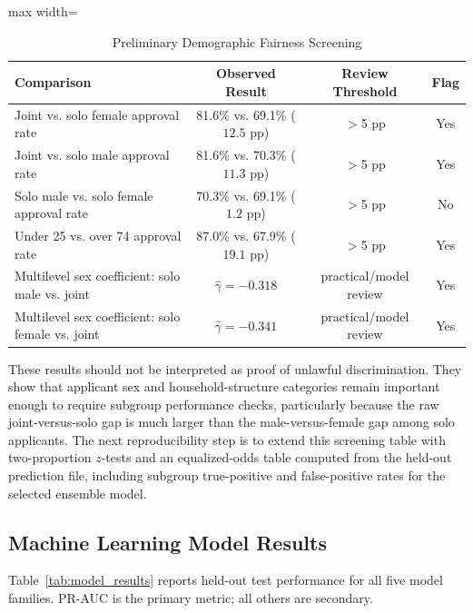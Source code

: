 \documentclass[12pt,letterpaper]{article}
\begin{document}
\begin{table}[H]
\centering
\caption{Preliminary Demographic Fairness Screening}
\label{tab:fairness_screen}
\begin{adjustbox}{max width=\textwidth}
\begin{tabular}{lccc}
\toprule
\textbf{Comparison} & \textbf{Observed Result} & \textbf{Review Threshold} & \textbf{Flag} \\
\midrule
Joint vs. solo female approval rate & 81.6\% vs. 69.1\% ($12.5$ pp) & $>$5 pp & Yes \\
Joint vs. solo male approval rate & 81.6\% vs. 70.3\% ($11.3$ pp) & $>$5 pp & Yes \\
Solo male vs. solo female approval rate & 70.3\% vs. 69.1\% ($1.2$ pp) & $>$5 pp & No \\
Under 25 vs. over 74 approval rate & 87.0\% vs. 67.9\% ($19.1$ pp) & $>$5 pp & Yes \\
Multilevel sex coefficient: solo male vs. joint & $\hat{\gamma}=-0.318$ & practical/model review & Yes \\
Multilevel sex coefficient: solo female vs. joint & $\hat{\gamma}=-0.341$ & practical/model review & Yes \\
\bottomrule
\end{tabular}
\end{adjustbox}
\end{table}

These results should not be interpreted as proof of unlawful discrimination. They show that
applicant sex and household-structure categories remain important enough to require subgroup
performance checks, particularly because the raw joint-versus-solo gap is much larger than the
male-versus-female gap among solo applicants. The next reproducibility step is to extend this
screening table with two-proportion $z$-tests and an equalized-odds table computed from the
held-out prediction file, including subgroup true-positive and false-positive rates for the
selected ensemble model.

\subsection{Machine Learning Model Results}

Table~\ref{tab:model_results} reports held-out test performance for all five model families.
PR-AUC is the primary metric; all others are secondary.
\end{document}
